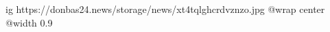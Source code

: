  
 
 
 
 

\ifcmt
  ig https://donbas24.news/storage/news/xt4tqlghcrdvznzo.jpg
  @wrap center
  @width 0.9
\fi
